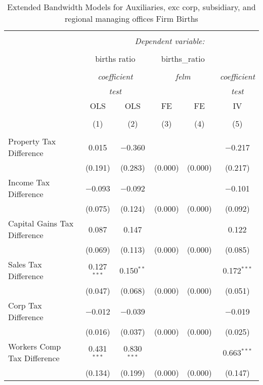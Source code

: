 
\begin{table}[!htbp] \centering 
  \caption{Extended Bandwidth Models for  Auxiliaries, exc corp, subsidiary, and regional managing offices Firm Births} 
  \label{} 
\begin{tabular}{@{\extracolsep{5pt}}lccccc} 
\\[-1.8ex]\hline 
\hline \\[-1.8ex] 
 & \multicolumn{5}{c}{\textit{Dependent variable:}} \\ 
\cline{2-6} 
\\[-1.8ex] & \multicolumn{2}{c}{births ratio} & \multicolumn{2}{c}{births\_ratio} &   \\ 
\\[-1.8ex] & \multicolumn{2}{c}{\textit{coefficient}} & \multicolumn{2}{c}{\textit{felm}} & \textit{coefficient} \\ 
 & \multicolumn{2}{c}{\textit{test}} & \multicolumn{2}{c}{\textit{}} & \textit{test} \\ 
 & OLS & OLS & FE & FE & IV \\ 
\\[-1.8ex] & (1) & (2) & (3) & (4) & (5)\\ 
\hline \\[-1.8ex] 
 Property Tax Difference & 0.015 & $-$0.360 &  &  & $-$0.217 \\ 
  & (0.191) & (0.283) & (0.000) & (0.000) & (0.217) \\ 
  Income Tax Difference & $-$0.093 & $-$0.092 &  &  & $-$0.101 \\ 
  & (0.075) & (0.124) & (0.000) & (0.000) & (0.092) \\ 
  Capital Gains Tax Difference & 0.087 & 0.147 &  &  & 0.122 \\ 
  & (0.069) & (0.113) & (0.000) & (0.000) & (0.085) \\ 
  Sales Tax Difference & 0.127$^{***}$ & 0.150$^{**}$ &  &  & 0.172$^{***}$ \\ 
  & (0.047) & (0.068) & (0.000) & (0.000) & (0.051) \\ 
  Corp Tax Difference & $-$0.012 & $-$0.039 &  &  & $-$0.019 \\ 
  & (0.016) & (0.037) & (0.000) & (0.000) & (0.025) \\ 
  Workers Comp Tax Difference & 0.431$^{***}$ & 0.830$^{***}$ &  &  & 0.663$^{***}$ \\ 
  & (0.134) & (0.199) & (0.000) & (0.000) & (0.147) \\ 

\end{tabular}
\end{table}
